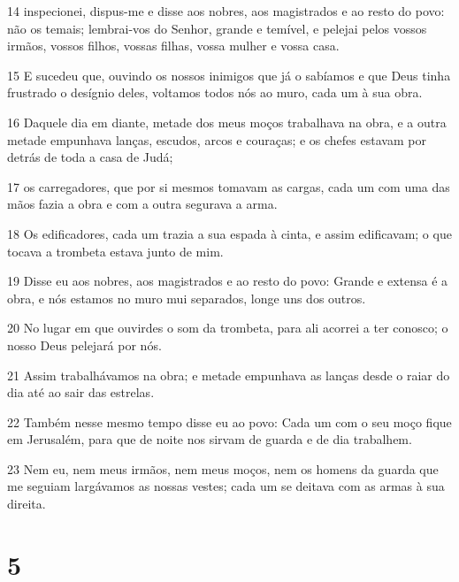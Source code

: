 \par 14 inspecionei, dispus-me e disse aos nobres, aos magistrados e ao resto do povo: não os temais; lembrai-vos do Senhor, grande e temível, e pelejai pelos vossos irmãos, vossos filhos, vossas filhas, vossa mulher e vossa casa.
\par 15 E sucedeu que, ouvindo os nossos inimigos que já o sabíamos e que Deus tinha frustrado o desígnio deles, voltamos todos nós ao muro, cada um à sua obra.
\par 16 Daquele dia em diante, metade dos meus moços trabalhava na obra, e a outra metade empunhava lanças, escudos, arcos e couraças; e os chefes estavam por detrás de toda a casa de Judá;
\par 17 os carregadores, que por si mesmos tomavam as cargas, cada um com uma das mãos fazia a obra e com a outra segurava a arma.
\par 18 Os edificadores, cada um trazia a sua espada à cinta, e assim edificavam; o que tocava a trombeta estava junto de mim.
\par 19 Disse eu aos nobres, aos magistrados e ao resto do povo: Grande e extensa é a obra, e nós estamos no muro mui separados, longe uns dos outros.
\par 20 No lugar em que ouvirdes o som da trombeta, para ali acorrei a ter conosco; o nosso Deus pelejará por nós.
\par 21 Assim trabalhávamos na obra; e metade empunhava as lanças desde o raiar do dia até ao sair das estrelas.
\par 22 Também nesse mesmo tempo disse eu ao povo: Cada um com o seu moço fique em Jerusalém, para que de noite nos sirvam de guarda e de dia trabalhem.
\par 23 Nem eu, nem meus irmãos, nem meus moços, nem os homens da guarda que me seguiam largávamos as nossas vestes; cada um se deitava com as armas à sua direita.

\chapter{5}

